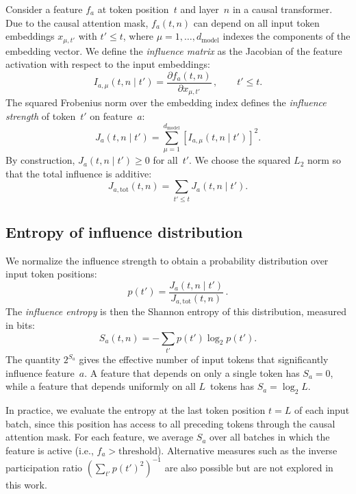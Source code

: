 \documentclass{article}
\begin{document}
Consider a feature $f_a$ at token position~$t$ and layer~$n$ in a causal
transformer. Due to the causal attention mask, $f_a(t,n)$ can depend on
all input token embeddings $x_{\mu,t'}$ with $t' \le t$, where
$\mu = 1, \ldots, d_{\mathrm{model}}$ indexes the components of the
embedding vector. We define the \emph{influence matrix} as the Jacobian
of the feature activation with respect to the input embeddings:
\begin{equation}
    \label{eq:influence_matrix}
    I_{a,\mu}(t,n \mid t')
    = \frac{\partial f_a(t,n)}{\partial x_{\mu,t'}}\,,
    \qquad t' \le t.
\end{equation}
The squared Frobenius norm over the embedding index defines the
\emph{influence strength} of token~$t'$ on feature~$a$:
\begin{equation}
    \label{eq:influence_strength}
    J_a(t,n \mid t')
    = \sum_{\mu=1}^{d_{\mathrm{model}}}
        [I_{a,\mu}(t,n \mid t')]^2.
\end{equation}
By construction, $J_a(t,n \mid t') \ge 0$ for all~$t'$. We choose the
squared $L_2$ norm so that the total influence is additive:
\begin{equation}
    \label{eq:total_influence}
    J_{a,\mathrm{tot}}(t,n)
    = \sum_{t' \le t} J_a(t,n \mid t').
\end{equation}

\subsection{Entropy of influence distribution}
\label{sec:entropy}

We normalize the influence strength to obtain a probability distribution
over input token positions:
\begin{equation}
    \label{eq:prob}
    p(t') = \frac{J_a(t,n \mid t')}{J_{a,\mathrm{tot}}(t,n)}\,.
\end{equation}
The \emph{influence entropy} is then the Shannon entropy of this
distribution, measured in bits:
\begin{equation}
    \label{eq:entropy}
    S_a(t,n) = -\sum_{t'} p(t') \log_2 p(t').
\end{equation}
The quantity $2^{S_a}$ gives the effective number of input tokens that
significantly influence feature~$a$. A feature that depends on only a
single token has $S_a = 0$, while a feature that depends uniformly on all
$L$~tokens has $S_a = \log_2 L$.

In practice, we evaluate the entropy at the last token position $t = L$ of
each input batch, since this position has access to all preceding tokens
through the causal attention mask. For each feature, we average $S_a$ over
all batches in which the feature is active (i.e.,
$f_a > \text{threshold}$). Alternative measures such as the inverse
participation ratio $(\sum_{t'} p(t')^2)^{-1}$ are also possible but are
not explored in this work.
\end{document}
